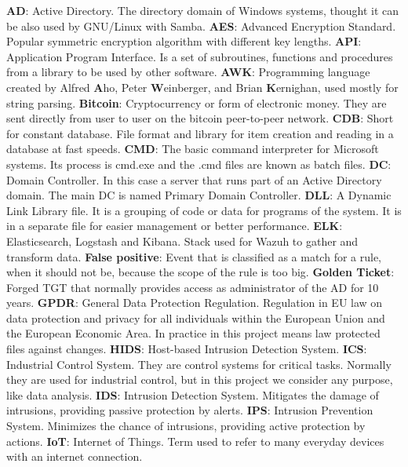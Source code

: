 \textbf{AD}: Active Directory. The directory domain of Windows systems, thought it can be also used by GNU/Linux with Samba.
\linej
\linej
\textbf{AES}: Advanced Encryption Standard. Popular symmetric encryption algorithm with different key lengths.
\linej
\linej
\textbf{API}: Application Program Interface. Is a set of subroutines, functions and procedures from a library to be used by other software.
\linej
\linej
\textbf{AWK}: Programming language created by Alfred \textbf{A}ho, Peter \textbf{W}einberger, and Brian \textbf{K}ernighan, used mostly for string parsing.
\linej
\linej
\textbf{Bitcoin}: Cryptocurrency or form of electronic money. They are sent directly from user to user on the bitcoin peer-to-peer network.
\linej
\linej
\textbf{CDB}: Short for constant database. File format and library for item creation and reading in a database at fast speeds.
\linej
\linej
\textbf{CMD}: The basic command interpreter for Microsoft systems. Its process is cmd.exe and the .cmd files are known as batch files.
\linej
\linej
\textbf{DC}: Domain Controller. In this case a server that runs part of an Active Directory domain. The main DC is named Primary Domain Controller.
\linej
\linej
\textbf{DLL}: A Dynamic Link Library file. It is a grouping of code or data for programs of the system. It is in a separate file for easier management or better performance.
\linej
\linej
\textbf{ELK}: Elasticsearch, Logstash and Kibana. Stack used for Wazuh to gather and transform data.
\linej
\linej
\textbf{False positive}: Event that is classified as a match for a rule, when it should not be, because the scope of the rule is too big.
\linej
\linej
\textbf{Golden Ticket}: Forged TGT that normally provides access as administrator of the AD for 10 years.
\linej
\linej
\textbf{GPDR}: General Data Protection Regulation. Regulation in EU law on data protection and privacy for all individuals within the European Union and the European Economic Area. In practice in this project means law protected files against changes.
\linej
\linej
\textbf{HIDS}: Host-based Intrusion Detection System.
\linej
\linej
\textbf{ICS}: Industrial Control System. They are control systems for critical tasks. Normally they are used for industrial control, but in this project we consider any purpose, like data analysis.
\linej
\linej
\textbf{IDS}: Intrusion Detection System. Mitigates the damage of intrusions, providing passive protection by alerts.
\linej
\linej
\textbf{IPS}: Intrusion Prevention System. Minimizes the chance of intrusions, providing active protection by actions.
\linej
\linej
\textbf{IoT}: Internet of Things. Term used to refer to many everyday devices with an internet connection.
